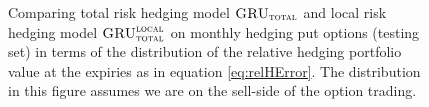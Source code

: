 \documentclass[letterpaper,12pt,titlepage,oneside,final]{book}
\numberwithin{equation}{section}
\theoremstyle{definition}
\newcommand{\modelT}{\textsc{GRU}_{\textsc{total}}}
\newcommand{\modelL}{\textsc{GRU}_{\textsc{total}}^{\textsc{local}}}
\begin{document}
\begin{figure}[htp!]
	\centering
	\caption{Comparing total risk hedging model $\modelT$ and local risk hedging model $\modelL$ on monthly hedging put options (testing set) in terms of the distribution of the  relative hedging portfolio value at the expiries as in equation \eqref{eq:relHError}. The distribution in this figure assumes we are on the sell-side of the option trading.} \label{fig:AppputTotalM1}
\end{figure}











 
\end{document}
